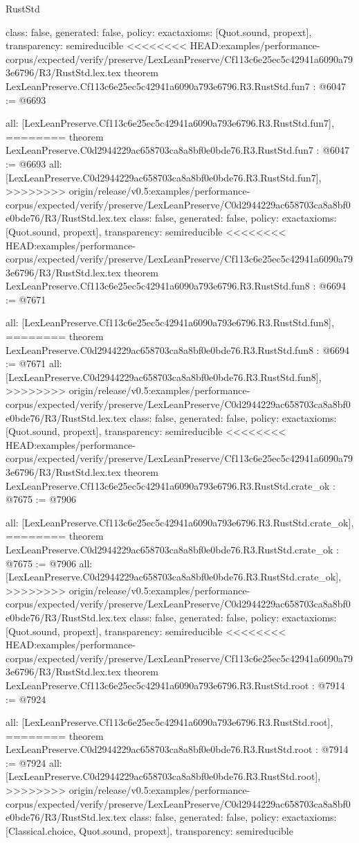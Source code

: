 \begin{lexlean}{RustStd}
\begin{coremodule}
{\begin{coremodule}
{{{{{{{{{{  class: false,
  generated: false,
  policy: exact{axioms: [Quot.sound, propext]},
  transparency: semireducible
}
<<<<<<<< HEAD:examples/performance-corpus/expected/verify/preserve/LexLeanPreserve/Cf113c6e25ec5c42941a6090a793e6796/R3/RustStd.lex.tex
theorem LexLeanPreserve.Cf113c6e25ec5c42941a6090a793e6796.R3.RustStd.fun7 : @6047 := @6693 {
  all: [LexLeanPreserve.Cf113c6e25ec5c42941a6090a793e6796.R3.RustStd.fun7],
========
theorem LexLeanPreserve.C0d2944229ac658703ca8a8bf0e0bde76.R3.RustStd.fun7 : @6047 := @6693 {
  all: [LexLeanPreserve.C0d2944229ac658703ca8a8bf0e0bde76.R3.RustStd.fun7],
>>>>>>>> origin/release/v0.5:examples/performance-corpus/expected/verify/preserve/LexLeanPreserve/C0d2944229ac658703ca8a8bf0e0bde76/R3/RustStd.lex.tex
  class: false,
  generated: false,
  policy: exact{axioms: [Quot.sound, propext]},
  transparency: semireducible
}
<<<<<<<< HEAD:examples/performance-corpus/expected/verify/preserve/LexLeanPreserve/Cf113c6e25ec5c42941a6090a793e6796/R3/RustStd.lex.tex
theorem LexLeanPreserve.Cf113c6e25ec5c42941a6090a793e6796.R3.RustStd.fun8 : @6694 := @7671 {
  all: [LexLeanPreserve.Cf113c6e25ec5c42941a6090a793e6796.R3.RustStd.fun8],
========
theorem LexLeanPreserve.C0d2944229ac658703ca8a8bf0e0bde76.R3.RustStd.fun8 : @6694 := @7671 {
  all: [LexLeanPreserve.C0d2944229ac658703ca8a8bf0e0bde76.R3.RustStd.fun8],
>>>>>>>> origin/release/v0.5:examples/performance-corpus/expected/verify/preserve/LexLeanPreserve/C0d2944229ac658703ca8a8bf0e0bde76/R3/RustStd.lex.tex
  class: false,
  generated: false,
  policy: exact{axioms: [Quot.sound, propext]},
  transparency: semireducible
}
<<<<<<<< HEAD:examples/performance-corpus/expected/verify/preserve/LexLeanPreserve/Cf113c6e25ec5c42941a6090a793e6796/R3/RustStd.lex.tex
theorem LexLeanPreserve.Cf113c6e25ec5c42941a6090a793e6796.R3.RustStd.crate_ok : @7675 := @7906 {
  all: [LexLeanPreserve.Cf113c6e25ec5c42941a6090a793e6796.R3.RustStd.crate_ok],
========
theorem LexLeanPreserve.C0d2944229ac658703ca8a8bf0e0bde76.R3.RustStd.crate_ok : @7675 := @7906 {
  all: [LexLeanPreserve.C0d2944229ac658703ca8a8bf0e0bde76.R3.RustStd.crate_ok],
>>>>>>>> origin/release/v0.5:examples/performance-corpus/expected/verify/preserve/LexLeanPreserve/C0d2944229ac658703ca8a8bf0e0bde76/R3/RustStd.lex.tex
  class: false,
  generated: false,
  policy: exact{axioms: [Quot.sound, propext]},
  transparency: semireducible
}
<<<<<<<< HEAD:examples/performance-corpus/expected/verify/preserve/LexLeanPreserve/Cf113c6e25ec5c42941a6090a793e6796/R3/RustStd.lex.tex
theorem LexLeanPreserve.Cf113c6e25ec5c42941a6090a793e6796.R3.RustStd.root : @7914 := @7924 {
  all: [LexLeanPreserve.Cf113c6e25ec5c42941a6090a793e6796.R3.RustStd.root],
========
theorem LexLeanPreserve.C0d2944229ac658703ca8a8bf0e0bde76.R3.RustStd.root : @7914 := @7924 {
  all: [LexLeanPreserve.C0d2944229ac658703ca8a8bf0e0bde76.R3.RustStd.root],
>>>>>>>> origin/release/v0.5:examples/performance-corpus/expected/verify/preserve/LexLeanPreserve/C0d2944229ac658703ca8a8bf0e0bde76/R3/RustStd.lex.tex
  class: false,
  generated: false,
  policy: exact{axioms: [Classical.choice, Quot.sound, propext]},
  transparency: semireducible
}

}}}}}}}}}}}}}
\end{coremodule}}
\end{coremodule}
\end{lexlean}
